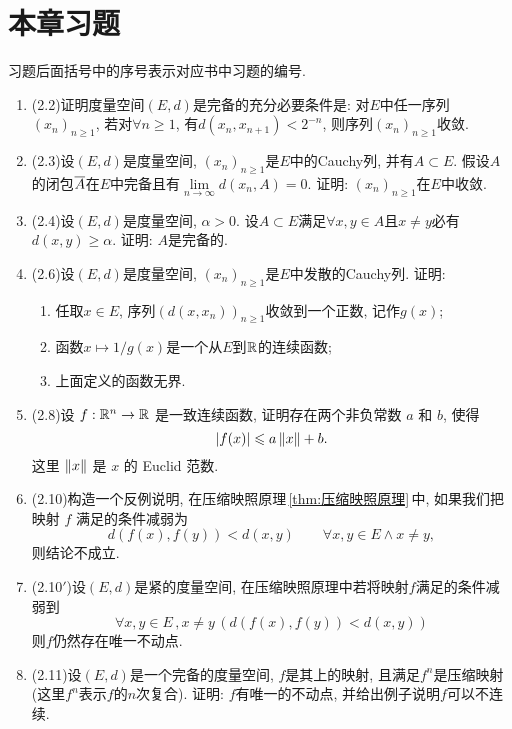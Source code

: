     \section*{本章习题}

    习题后面括号中的序号表示对应书中习题的编号.

    \begin{enumerate}[label=\textbf{\arabic*.}, ref=\arabic*]
    \item (2.2)证明度量空间$ (E,d) $是完备的充分必要条件是: 对$ E $中任一序列$ (x_n)_{n\geqslant 1} $, 若对$ \forall n\geqslant 1 $, 有$ d(x_n,x_{n+1})<2^{-n} $, 则序列$ (x_n)_{n\geqslant 1} $收敛. 
    \item (2.3)设$ (E,d) $是度量空间, $ (x_n)_{n\geqslant 1} $是$ E $中的Cauchy列, 并有$ A\subset E $. 假设$ A $的闭包$ \baro{A} $在$ E $中完备且有$ \lim\limits_{n\to\infty}d(x_n,A)=0 $. 证明: $ (x_n)_{n\geqslant 1} $在$ E $中收敛. 
    \item (2.4)设$ (E,d) $是度量空间, $ \alpha>0 $. 设$ A\subset E $满足$ \forall x,y\in A $且$ x\ne y $必有$ d(x,y)\geqslant\alpha $. 证明: $ A $是完备的. 
    \item (2.6)设$ (E,d) $是度量空间, $ (x_n)_{n\geqslant 1} $是$ E $中发散的Cauchy列. 证明:
        \begin{enumerate}[(1)]
        \item 任取$ x\in E $, 序列$ (d(x,x_n))_{n\geqslant 1} $收敛到一个正数, 记作$ g(x) $;
        \item 函数$ x\mapsto1/g(x) $是一个从$ E $到$ \R $的连续函数;
        \item 上面定义的函数无界.
        \end{enumerate}
    \item (2.8)设 $ f: \R^{n}\to\R $ 是一致连续函数, 证明存在两个非负常数 $ a $ 和 $ b $, 使得
        \[
            \abs{f(x)}\leqslant a\norm{x}+b.
        \]
        这里 $ \norm{x} $ 是 $ x $ 的 Euclid 范数. 
    \item (2.10)构造一个反例说明, 在压缩映照原理\,\ref{thm:压缩映照原理}\,中, 如果我们把映射 $ f $ 满足的条件减弱为
        \[
            d(f(x), f(y))<d(x, y)\qquad \forall x, y\in E\wedge x\neq y,
        \]
        则结论不成立. 
    \item (2.10$ ' $)设$ (E,d) $是紧的度量空间, 在压缩映照原理中若将映射$ f $满足的条件减弱到
        \[
        \forall x,y\in E\,,x\ne y\,(d(f(x),f(y))<d(x,y))
        \]
        则$ f $仍然存在唯一不动点. 
    \item (2.11)设$ (E,d) $是一个完备的度量空间, $ f $是其上的映射, 且满足$ f^n $是压缩映射(这里$ f^n $表示$ f $的$ n $次复合). 证明: $ f $有唯一的不动点, 并给出例子说明$ f $可以不连续. 

\end{enumerate}
